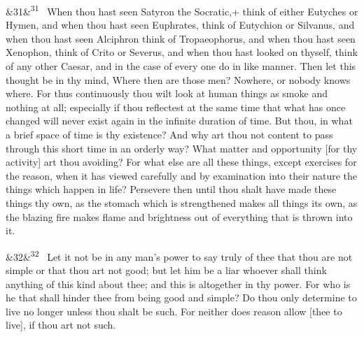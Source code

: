 \documentclass[12pt]{article}
\newcommand{\para}[1][]{\par\noindent\ifx&#1&\else\textsuperscript{\footnotesize #1}~\fi}
\begin{document}
\para[31] When thou hast seen Satyron the Socratic,+ think of either
Eutyches or Hymen, and when thou hast seen Euphrates, think of Eutychion
or Silvanus, and when thou hast seen Alciphron think of Tropaeophorus,
and when thou hast seen Xenophon, think of Crito or Severus, and when
thou hast looked on thyself, think of any other Caesar, and in the case
of every one do in like manner. Then let this thought be in thy mind,
Where then are those men? Nowhere, or nobody knows where. For thus
continuously thou wilt look at human things as smoke and nothing at all;
especially if thou reflectest at the same time that what has once
changed will never exist again in the infinite duration of time. But
thou, in what a brief space of time is thy existence? And why art thou
not content to pass through this short time in an orderly way? What
matter and opportunity [for thy activity] art thou avoiding? For what
else are all these things, except exercises for the reason, when it has
viewed carefully and by examination into their nature the things which
happen in life? Persevere then until thou shalt have made these things
thy own, as the stomach which is strengthened makes all things its own,
as the blazing fire makes flame and brightness out of everything that is
thrown into it.

\para[32] Let it not be in any man's power to say truly of thee that thou are
not simple or that thou art not good; but let him be a liar whoever
shall think anything of this kind about thee; and this is altogether in
thy power. For who is he that shall hinder thee from being good and
simple? Do thou only determine to live no longer unless thou shalt be
such. For neither does reason allow [thee to live], if thou art not
such.
\end{document}
